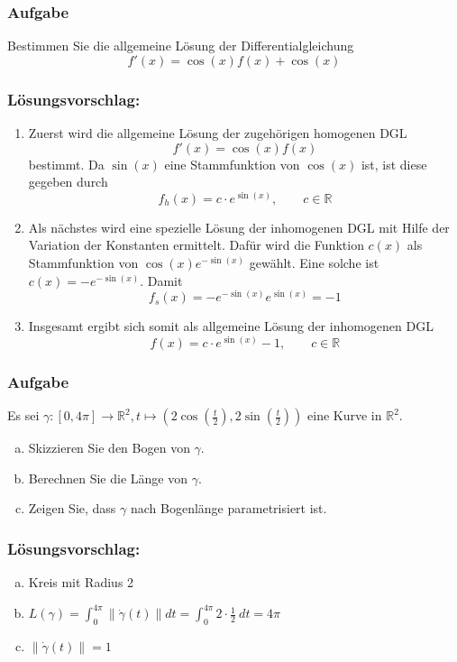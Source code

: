 \documentclass[a4paper,11pt]{scrartcl}
\newcounter{auf}
\newcommand{\Aufgabe}%
        {\addtocounter{auf}{1} \subsubsection*{\rmfamily  Aufgabe \theauf \hspace{1em}} }
\newcommand{\RR}{\mathbb{R}}
\begin{document}
\newpage
\Aufgabe
Bestimmen Sie die allgemeine Lösung der Differentialgleichung
$$
f'(x)=\cos(x)f(x)+\cos(x)
$$


\subsubsection*{Lösungsvorschlag:}
\begin{enumerate}[1)]
\item Zuerst wird die allgemeine Lösung der zugehörigen homogenen DGL 
$$
f'(x)=\cos(x)f(x)
$$
bestimmt. Da $\sin(x)$ eine Stammfunktion von $\cos(x)$ ist, ist diese gegeben durch
$$
f_h(x)=c\cdot e^{\sin(x)} ,\qquad c \in \RR
$$
\item Als nächstes wird eine spezielle Lösung der inhomogenen DGL mit Hilfe der Variation der Konstanten ermittelt. Dafür wird die Funktion $c(x)$ als Stammfunktion von $\cos(x)e^{-\sin(x)}$ gewählt. Eine solche ist $c(x)=-e^{-\sin(x)}$. Damit
$$
f_s(x)=-e^{-\sin(x)}e^{\sin(x)}=-1
$$
\item Insgesamt ergibt sich somit als allgemeine Lösung der inhomogenen DGL
$$
f(x)=c\cdot e^{\sin(x)}-1 ,\qquad c \in \RR
$$
\end{enumerate}


\newpage
\Aufgabe
Es sei $\gamma : [0,4\pi] \to \RR^2, t \mapsto \left(2\cos(\frac{t}{2}), 2 \sin(\frac{t}{2}) \right)$ eine Kurve in $\RR^2$.
\begin{enumerate}[a)]
\item Skizzieren Sie den Bogen von $\gamma$.
\item Berechnen Sie die Länge von $\gamma$.
\item Zeigen Sie, dass $\gamma$ nach Bogenlänge parametrisiert ist.
\end{enumerate}


\subsubsection*{Lösungsvorschlag:}
\begin{enumerate}[a)]
\item Kreis mit Radius 2
\item $L(\gamma)=\int_0^{4\pi} \|\dot \gamma(t)\|dt=\int_0^{4\pi}2 \cdot \frac{1}{2} \ dt=4\pi$
\item $\|\dot \gamma(t)\|=1$
\end{enumerate}
\end{document}
